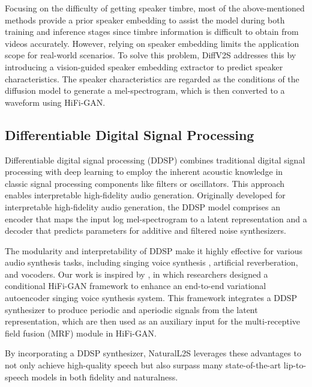 Focusing on the difficulty of getting speaker timbre, most of the above-mentioned methods provide a prior speaker embedding to assist the model during both training and inference stages since timbre information is difficult to obtain from videos accurately. However, relying on speaker embedding limits the application scope for real-world scenarios. To solve this problem, DiffV2S\cite{choi2023} addresses this by introducing a vision-guided speaker embedding extractor to predict speaker characteristics. The speaker characteristics are regarded as the conditions of the diffusion model\cite{sohl2015deep} to generate a mel-spectrogram, which is then converted to a waveform using HiFi-GAN. 

\subsection{Differentiable Digital Signal Processing}
Differentiable digital signal processing (DDSP) \cite{engel2019} combines traditional digital signal processing with deep learning to employ the inherent acoustic knowledge in classic signal processing components like filters or oscillators. This approach enables interpretable high-fidelity audio generation. Originally developed for interpretable high-fidelity audio generation, the DDSP model comprises an encoder that maps the input log mel-spectrogram to a latent representation and a decoder that predicts parameters for additive and filtered noise synthesizers.

The modularity and interpretability of DDSP make it highly effective for various audio synthesis tasks, including singing voice synthesis \cite{zhang2022}, artificial reverberation\cite{lee2022differentiable}, and vocoders\cite{li2023}. Our work is inspired by \cite{zhang2022}, in which researchers designed a conditional HiFi-GAN framework to enhance an end-to-end variational autoencoder singing voice synthesis system. This framework integrates a DDSP synthesizer to produce periodic and aperiodic signals from the latent representation, which are then used as an auxiliary input for the multi-receptive field fusion (MRF) module in HiFi-GAN.

By incorporating a DDSP synthesizer, NaturalL2S leverages these advantages to not only achieve high-quality speech but also surpass many state-of-the-art lip-to-speech models in both fidelity and naturalness.